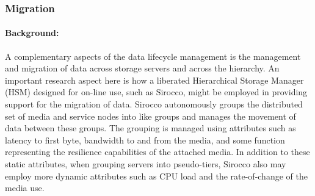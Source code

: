 
\subsubsection{Migration}
\label{sec:migration}

\paragraph{Background:} 
A complementary aspects of the data lifecycle management is the management and 
migration of data across storage servers and across the hierarchy. 
An important research aspect here is how a liberated Hierarchical Storage
Manager (HSM) designed for on-line use, such as Sirocco, might be employed in
providing support for the migration of data. Sirocco autonomously groups the
distributed set of media and service nodes into like groups and manages the
movement of data between these groups. The grouping is managed using
attributes such as latency to first byte, bandwidth to and from the media, and
some function representing the resilience capabilities of the attached media.
In addition to these static attributes, when grouping servers into
pseudo-tiers, Sirocco also may employ more dynamic attributes such as CPU load
and the rate-of-change of the media use. 

